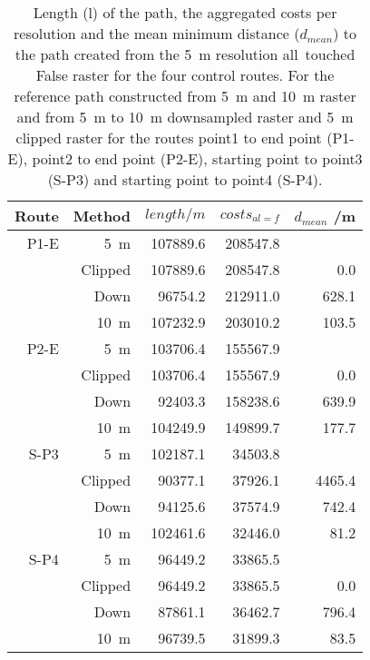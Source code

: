 \begin{table}[ht!]
	\caption{Length (l) of the path, the aggregated costs per resolution and the mean minimum distance ($d_{mean}$) to the path created from the 5~m resolution all~touched False raster for the four control routes. For the reference path constructed from 5~m  and 10~m raster and from 5~m to 10~m downsampled raster and 5~m clipped raster for the routes point1 to end point (P1-E), point2 to end point (P2-E), starting point to point3 (S-P3) and starting point to point4 (S-P4).}
	\label{tab:6}
	\centering
	\begin{tabular}{ r @{\hspace*{3mm}}  r  r  r  r}
		Route & Method & $length /m$ & $costs_{al=f}$ & $d_{mean}$ /m \\
		\hline
		P1-E & 5~m 			& 107889.6 & 208547.8 &        \\
		 	 & Clipped 		& 107889.6 & 208547.8 &   0.0  \\
		 	 & Down			&  96754.2 & 212911.0 & 628.1 \\
		 	 & 10~m 		& 107232.9 & 203010.2 & 103.5 \\
		\hline
		P2-E & 5~m 			& 103706.4 & 155567.9 &        \\
		 	 & Clipped 		& 103706.4 & 155567.9 &   0.0 \\
		 	 & Down 	    &  92403.3 & 158238.6	& 639.9 \\
		 	 & 10~m 		& 104249.9 & 149899.7 & 177.7 \\
		\hline
		S-P3 & 5~m 			& 102187.1 & 34503.8 	&         \\
			 & Clipped 		&  90377.1 & 37926.1 	& 4465.4 \\
			 & Down 	    &  94125.6 & 37574.9 	&  742.4 \\
			 & 10~m 		& 102461.6 & 32446.0 	&   81.2 \\
		\hline
		S-P4 & 5~m 			& 96449.2 	& 33865.5 	&  		\\
		 	 & Clipped 		& 96449.2 	& 33865.5 	& 0.0 	\\
			 & Down 		& 87861.1 	& 36462.7 	& 796.4\\
			 & 10~m 		& 96739.5 	& 31899.3	& 83.5 \\

		
	\end{tabular}
\end{table}



